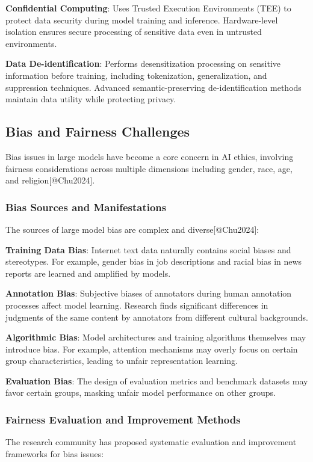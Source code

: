 \documentclass{article}
\begin{document}
\textbf{Confidential Computing}: Uses Trusted Execution Environments (TEE) to protect data security during model training and inference. Hardware-level isolation ensures secure processing of sensitive data even in untrusted environments.

\textbf{Data De-identification}: Performs desensitization processing on sensitive information before training, including tokenization, generalization, and suppression techniques. Advanced semantic-preserving de-identification methods maintain data utility while protecting privacy.

\subsection{Bias and Fairness Challenges}
Bias issues in large models have become a core concern in AI ethics, involving fairness considerations across multiple dimensions including gender, race, age, and religion[@Chu2024].

\subsubsection{Bias Sources and Manifestations}
The sources of large model bias are complex and diverse[@Chu2024]:

\textbf{Training Data Bias}: Internet text data naturally contains social biases and stereotypes. For example, gender bias in job descriptions and racial bias in news reports are learned and amplified by models.

\textbf{Annotation Bias}: Subjective biases of annotators during human annotation processes affect model learning. Research finds significant differences in judgments of the same content by annotators from different cultural backgrounds.

\textbf{Algorithmic Bias}: Model architectures and training algorithms themselves may introduce bias. For example, attention mechanisms may overly focus on certain group characteristics, leading to unfair representation learning.

\textbf{Evaluation Bias}: The design of evaluation metrics and benchmark datasets may favor certain groups, masking unfair model performance on other groups.

\subsubsection{Fairness Evaluation and Improvement Methods}
The research community has proposed systematic evaluation and improvement frameworks for bias issues:
\end{document}
